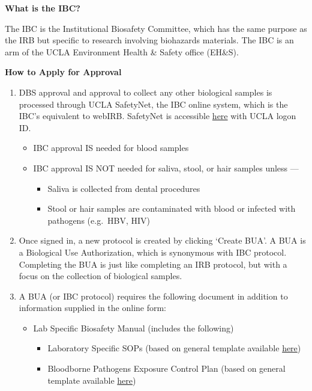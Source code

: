 \documentclass[]{book}
\providecommand{\tightlist}{%
  \setlength{\itemsep}{0pt}\setlength{\parskip}{0pt}}
\begin{document}
\textbf{What is the IBC?}

The IBC is the Institutional Biosafety Committee, which has the same purpose as the IRB but specific to research involving biohazards materials. The IBC is an arm of the UCLA Environment Health \& Safety office (EH\&S).

\textbf{How to Apply for Approval}

\begin{enumerate}
\def\labelenumi{\arabic{enumi}.}
\tightlist
\item
  DBS approval and approval to collect any other biological samples is processed through UCLA SafetyNet, the IBC online system, which is the IBC's equivalent to webIRB. SafetyNet is accessible \href{https://safetynet.research.ucla.edu/}{here} with UCLA logon ID.

  \begin{itemize}
  \tightlist
  \item
    IBC approval IS needed for blood samples
  \item
    IBC approval IS NOT needed for saliva, stool, or hair samples unless ---

    \begin{itemize}
    \tightlist
    \item
      Saliva is collected from dental procedures
    \item
      Stool or hair samples are contaminated with blood or infected with pathogens (e.g.~HBV, HIV)
    \end{itemize}
  \end{itemize}
\item
  Once signed in, a new protocol is created by clicking `Create BUA'. A BUA is a Biological Use Authorization, which is synonymous with IBC protocol. Completing the BUA is just like completing an IRB protocol, but with a focus on the collection of biological samples.
\item
  A BUA (or IBC protocol) requires the following document in addition to information supplied in the online form:

  \begin{itemize}
  \tightlist
  \item
    Lab Specific Biosafety Manual (includes the following)

    \begin{itemize}
    \tightlist
    \item
      Laboratory Specific SOPs (based on general template available \href{https://ucla.app.box.com/v/ehs-bio-lab-biomanual}{here})
    \item
      Bloodborne Pathogens Exposure Control Plan (based on general template available \href{https://ucla.app.box.com/v/ehs-bbp-ecp-template}{here})
    \end{itemize}
  \end{itemize}
\end{enumerate}
\end{document}
